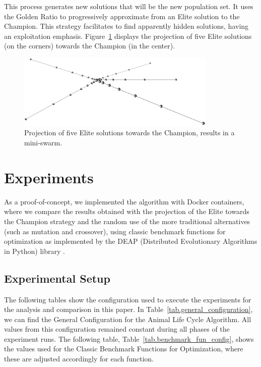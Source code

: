 \documentclass[graybox]{svmult}
\begin{document}
            This process generates new solutions that will be the new population set. It
            uses the Golden Ratio to progressively approximate from an Elite solution to
            the Champion. This strategy facilitates to find apparently hidden solutions,
            having an exploitation emphasis. Figure~\ref{fig.elite_projection_swarm}
            displays the projection of five Elite solutions (on the corners) towards the
            Champion (in the center).

            \begin{figure}
                \centering
                \includegraphics[width=0.85\textwidth]{img/fig_elite_projection_swarm.pdf}
                \caption{Projection of five Elite solutions towards the Champion, results in a mini-swarm.} \label{fig.elite_projection_swarm}
                \end{figure}
            
            \FloatBarrier

\section{Experiments}
    \label{section.experiments}

    As a proof-of-concept, we implemented the algorithm with Docker containers,
    where we compare the results obtained with the projection of the Elite towards
    the Champion strategy and the random use of the more traditional alternatives
    (such as mutation and crossover), using classic benchmark functions for
    optimization as implemented by the DEAP (Distributed Evolutionary Algorithms in
    Python) library \cite{fortin2012deap}.

    \subsection{Experimental Setup} 

        The following tables show the configuration used to execute the experiments for
        the analysis and comparison in this paper. In
        Table~\ref{tab.general_configuration}, we can find the General Configuration
        for the Animal Life Cycle Algorithm. All values from this configuration
        remained constant during all phases of the experiment runs. The following
        table, Table~\ref{tab.benchmark_fun_config}, shows the values used for the
        Classic Benchmark Functions for Optimization, where these are adjusted
        accordingly for each function.
\end{document}
